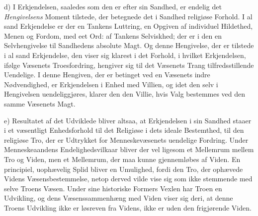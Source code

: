 d) I Erkjendelsen, saaledes som den er efter sin Sandhed, er endelig det
\emph{Hengivelsens} Moment tilstede, der betegnede det i Sandhed religiøse
Forhold. I al sand Erkjendelse er der en Tankens Luttring, en Opgiven af
individuel
 Hildethed, Menen og Fordom, med eet Ord: af Tankens Selviskhed; der er i den en
Selvhengivelse til Sandhedens absolute Magt. Og denne Hengivelse, der er
tilstede i al sand Erkjendelse, den viser sig klarest i det Forhold, i hvilket
Erkjendelsen, ifølge Væsenets Troesfordring, hengiver sig til det Væsenets
Trang tilfredsstillende Uendelige. I denne Hengiven, der er betinget ved en
Væsenets indre Nødvendighed, er Erkjendelsen i Enhed med Villien, og idet den
selv i Hengivelsen uendeliggjøres, klarer den den Villie, hvis Valg bestemmes
ved den samme Væsenets Magt.

e) Resultatet af det Udviklede bliver altsaa, at Erkjendelsen i sin Sandhed
staaer i et væsentligt Enhedsforhold til det Religiøse i dets ideale
Bestemthed, til den religiøse Tro, der er Udtrykket for Menneskevæsenets
uendelige Fordring. Under Menneskeaandens Endelighedsvilkaar bliver der vel
ligesom et Mellemrum mellem Tro og Viden, men et Mellemrum, der maa kunne
gjennemløbes af Viden. En principiel, uophævelig Splid bliver en Umulighed,
fordi den Tro, der ophævede Videns Væsensbestemmelse, netop derved vilde vise
sig som ikke stemmende med selve Troens Væsen. Under sine historiske Formers
Vexlen har Troen en Udvikling, og dens Væsenssammenhæng med Viden viser sig
deri, at denne Troens Udvikling ikke er løsreven fra Videns, ikke er uden den
frigjørende Viden.

